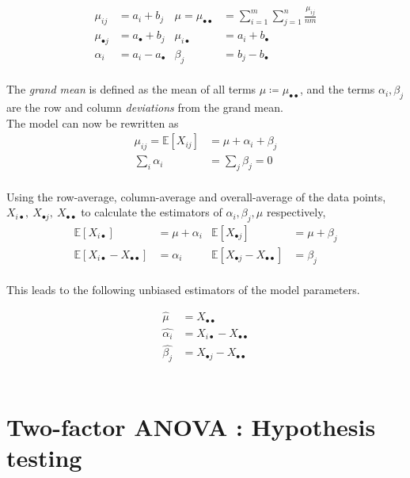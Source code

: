 \begin{align}
	\mu_{ij} &= a_i + b_j & \mu = \mu_{\bullet\bullet} &= \sum\limits_{i = 1}^{m} \sum\limits_{j = 1}^{n} \frac{\mu_{ij}}{nm} \\
	\mu_{\bullet j} &= a_{\bullet} + b_j & \mu_{i \bullet} &= a_{i} + b_{\bullet} \\
	\alpha_i &= a_i - a_{\bullet} & \beta_j &= b_j - b_{\bullet}
\end{align}\\

The \textit{grand mean} is defined as the mean of all terms $ \mu \coloneqq \mu_{\bullet \bullet} $, and the terms $ \alpha_i, \beta_j $ are the row and column \textit{deviations} from the grand mean.\\

The model can now be rewritten as\\

\begin{align}
	\mu_{ij} = \mathbb{E}[X_{ij}] &= \mu + \alpha_i + \beta_j \\
	\sum_{i} \alpha_i &= \sum_{j} \beta_j = 0 
\end{align}\\

Using the row-average, column-average and overall-average of the data points, $ X_{i\bullet},\ X_{\bullet j},\ X_{\bullet \bullet} $ to calculate the estimators of $ \alpha_i, \beta_j, \mu $ respectively,\\

\begin{align}
	\mathbb{E}[X_{i\bullet}] &= \mu + \alpha_i & \mathbb{E}[X_{\bullet j}] &= \mu + \beta_j \\
	\mathbb{E}[X_{i\bullet} - X_{\bullet \bullet}] &= \alpha_i & \mathbb{E}[X_{\bullet j} - X_{\bullet \bullet}] &=  \beta_j 
\end{align}\\

This leads to the following unbiased estimators of the model parameters.

\begin{align}
	\widehat{\mu} &= X_{\bullet \bullet} \nonumber \\
	\widehat{\alpha_i} &= X_{i\bullet} - X_{\bullet \bullet} \nonumber \\
	\widehat{\beta_j} &= X_{\bullet j} - X_{\bullet \bullet}
\end{align}\\

\section{Two-factor ANOVA : Hypothesis testing} 

